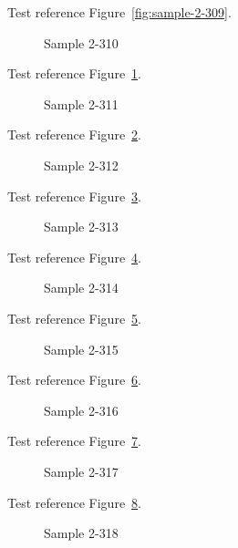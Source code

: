 Test reference Figure~\ref{fig:sample-2-309}.

\begin{figure}[tbhp]
\caption{Sample 2-310}
\label{fig:sample-2-310}
\end{figure}

Test reference Figure~\ref{fig:sample-2-310}.

\begin{figure}[tbhp]
\caption{Sample 2-311}
\label{fig:sample-2-311}
\end{figure}

Test reference Figure~\ref{fig:sample-2-311}.

\begin{figure}[tbhp]
\caption{Sample 2-312}
\label{fig:sample-2-312}
\end{figure}

Test reference Figure~\ref{fig:sample-2-312}.

\begin{figure}[tbhp]
\caption{Sample 2-313}
\label{fig:sample-2-313}
\end{figure}

Test reference Figure~\ref{fig:sample-2-313}.

\begin{figure}[tbhp]
\caption{Sample 2-314}
\label{fig:sample-2-314}
\end{figure}

Test reference Figure~\ref{fig:sample-2-314}.

\begin{figure}[tbhp]
\caption{Sample 2-315}
\label{fig:sample-2-315}
\end{figure}

Test reference Figure~\ref{fig:sample-2-315}.

\begin{figure}[tbhp]
\caption{Sample 2-316}
\label{fig:sample-2-316}
\end{figure}

Test reference Figure~\ref{fig:sample-2-316}.

\begin{figure}[tbhp]
\caption{Sample 2-317}
\label{fig:sample-2-317}
\end{figure}

Test reference Figure~\ref{fig:sample-2-317}.

\begin{figure}[tbhp]
\caption{Sample 2-318}
\label{fig:sample-2-318}
\end{figure}

